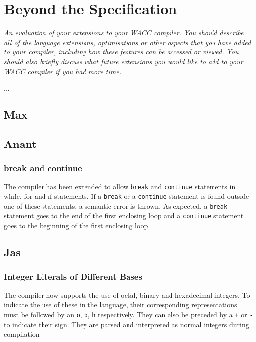 \documentclass[]{article}
\newcommand{\spec}[1]{\textit{#1}\par\noindent}
\begin{document}
\section{Beyond the Specification}
\spec{An evaluation of your extensions to your WACC compiler. You should describe all of the language extensions, optimisations or other aspects that you have added to your compiler, including how these features can be accessed or viewed. You should also briefly discuss what future extensions you would like to add to your WACC compiler if you had more time.}
...
\subsection{Max}



\subsection{Anant}
\subsubsection{break and continue}
{The compiler has been extended to allow {\tt break} and {\tt continue} statements in while, for and if statements. If a {\tt break} or a {\tt continue} statement is found outside one of these statements, a semantic error is thrown. As expected, a {\tt break} statement goes to the end of the first enclosing loop and a {\tt continue} statement goes to the beginning of the first enclosing loop}


\subsection{Jas}
\subsubsection{Integer Literals of Different Bases} {The compiler now supports the use of octal, binary and hexadecimal integers. To indicate the use of these in the language, their corresponding representations must be followed by an {\tt o}, {\tt b}, {\tt h} respectively. They can also be preceded by a {\tt +} or {\tt -} to indicate their sign. They are parsed and interpreted as normal integers during compilation}
\end{document}
